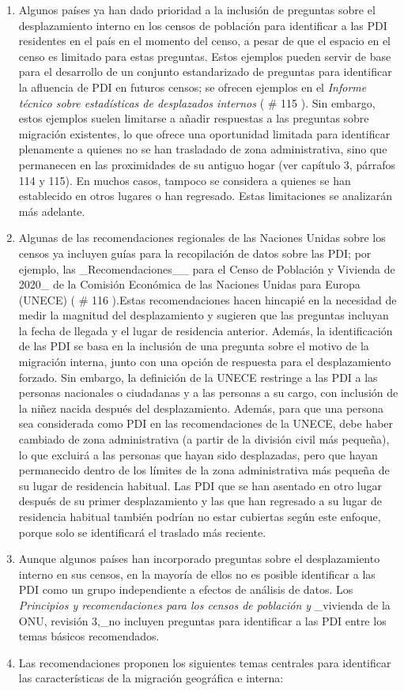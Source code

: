 \documentclass[
]{book}
\begin{document}
\begin{enumerate}
\item
  Algunos países ya han dado prioridad a la inclusión de preguntas sobre el desplazamiento interno en los censos de población para identificar a las PDI residentes en el país en el momento del censo, a pesar de que el espacio en el censo es limitado para estas preguntas. Estos ejemplos pueden servir de base para el desarrollo de un conjunto estandarizado de preguntas para identificar la afluencia de PDI en futuros censos; se ofrecen ejemplos en el \emph{Informe técnico sobre estadísticas de desplazados internos} (
  \# 115
  ). Sin embargo, estos ejemplos suelen limitarse a añadir respuestas a las preguntas sobre migración existentes, lo que ofrece una oportunidad limitada para identificar plenamente a quienes no se han trasladado de zona administrativa, sino que permanecen en las proximidades de su antiguo hogar (ver capítulo 3, párrafos 114 y 115). En muchos casos, tampoco se considera a quienes se han establecido en otros lugares o han regresado. Estas limitaciones se analizarán más adelante.
\item
  Algunas de las recomendaciones regionales de las Naciones Unidas sobre los censos ya incluyen guías para la recopilación de datos sobre las PDI; por ejemplo, las \_Recomendaciones\_\_ para el Censo de Población y Vivienda de 2020\_ de la Comisión Económica de las Naciones Unidas para Europa (UNECE) (
  \# 116
  ).Estas recomendaciones hacen hincapié en la necesidad de medir la magnitud del desplazamiento y sugieren que las preguntas incluyan la fecha de llegada y el lugar de residencia anterior. Además, la identificación de las PDI se basa en la inclusión de una pregunta sobre el motivo de la migración interna, junto con una opción de respuesta para el desplazamiento forzado. Sin embargo, la definición de la UNECE restringe a las PDI a las personas nacionales o ciudadanas y a las personas a su cargo, con inclusión de la niñez nacida después del desplazamiento. Además, para que una persona sea considerada como PDI en las recomendaciones de la UNECE, debe haber cambiado de zona administrativa (a partir de la división civil más pequeña), lo que excluirá a las personas que hayan sido desplazadas, pero que hayan permanecido dentro de los límites de la zona administrativa más pequeña de su lugar de residencia habitual. Las PDI que se han asentado en otro lugar después de su primer desplazamiento y las que han regresado a su lugar de residencia habitual también podrían no estar cubiertas según este enfoque, porque solo se identificará el traslado más reciente.
\item
  Aunque algunos países han incorporado preguntas sobre el desplazamiento interno en sus censos, en la mayoría de ellos no es posible identificar a las PDI como un grupo independiente a efectos de análisis de datos. Los \emph{Principios y recomendaciones para los censos de población y} \_vivienda de la ONU, revisión 3,\_no incluyen preguntas para identificar a las PDI entre los temas básicos recomendados.
\item
  Las recomendaciones proponen los siguientes temas centrales para identificar las características de la migración geográfica e interna:
\end{enumerate}
\end{document}
